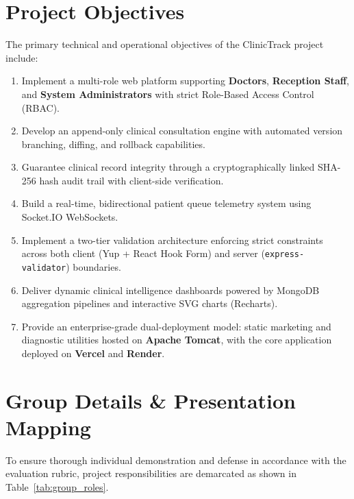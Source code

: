 \documentclass[12pt,a4paper,oneside]{report}
\begin{document}
\section{Project Objectives}
The primary technical and operational objectives of the ClinicTrack project include:
\begin{enumerate}
    \item Implement a multi-role web platform supporting \textbf{Doctors}, \textbf{Reception Staff}, and \textbf{System Administrators} with strict Role-Based Access Control (RBAC).
    \item Develop an append-only clinical consultation engine with automated version branching, diffing, and rollback capabilities.
    \item Guarantee clinical record integrity through a cryptographically linked SHA-256 hash audit trail with client-side verification.
    \item Build a real-time, bidirectional patient queue telemetry system using Socket.IO WebSockets.
    \item Implement a two-tier validation architecture enforcing strict constraints across both client (Yup + React Hook Form) and server (\texttt{express-validator}) boundaries.
    \item Deliver dynamic clinical intelligence dashboards powered by MongoDB aggregation pipelines and interactive SVG charts (Recharts).
    \item Provide an enterprise-grade dual-deployment model: static marketing and diagnostic utilities hosted on \textbf{Apache Tomcat}, with the core application deployed on \textbf{Vercel} and \textbf{Render}.
\end{enumerate}

\section{Group Details \& Presentation Mapping}
To ensure thorough individual demonstration and defense in accordance with the evaluation rubric, project responsibilities are demarcated as shown in Table~\ref{tab:group_roles}.
\end{document}
